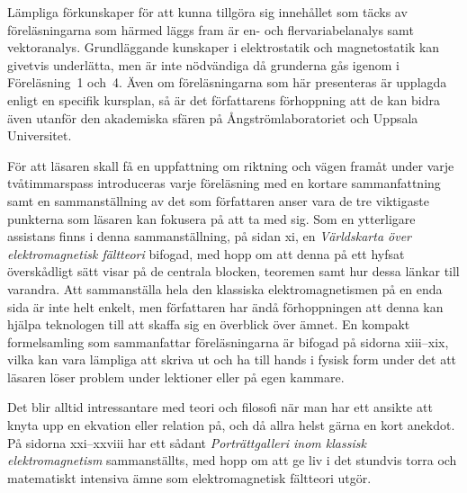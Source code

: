 {  L{\"a}mpliga f{\"o}rkunskaper f{\"o}r att kunna tillg{\"o}ra sig
  inneh{\aa}llet som t{\"a}cks av f{\"o}rel{\"a}sningarna som h{\"a}rmed
  l{\"a}ggs fram {\"a}r en- och flervariabelanalys samt vektoranalys.
  Grundl{\"a}ggande kunskaper i elektrostatik och magnetostatik kan givetvis
  underl{\"a}tta, men {\"a}r inte n{\"o}dv{\"a}ndiga d{\aa} grunderna g{\aa}s
  igenom i F{\"o}rel{\"a}sning~1 och~4.
  {\"A}ven om f{\"o}rel{\"a}sningarna som h{\"a}r presenteras {\"a}r upplagda
  enligt en specifik kursplan, s{\aa} {\"a}r det f{\"o}rfattarens
  f{\"o}rhoppning att de kan bidra {\"a}ven utanf{\"o}r den akademiska
  sf{\"a}ren p{\aa} {\AA}ngstr{\"o}mlaboratoriet och Uppsala Universitet.

  \bigskip{}\medskip\noindent
  F{\"o}r att l{\"a}saren skall f{\aa} en uppfattning om riktning och
  v{\"a}gen fram{\aa}t under varje tv{\aa}timmarspass introduceras varje
  f{\"o}rel{\"a}sning med en kortare sammanfattning samt en sammanst{\"a}llning
  av det som f{\"o}rfattaren anser vara de tre viktigaste punkterna som
  l{\"a}saren kan fokusera p{\aa} att ta med sig.
  Som en ytterligare assistans finns i denna sammanst{\"a}llning, p{\aa} sidan
  xi, en {\it V{\"a}rldskarta {\"o}ver elektromagnetisk f{\"a}ltteori}
  bifogad,
  med hopp om att denna p{\aa} ett hyfsat {\"o}versk{\aa}dligt s{\"a}tt visar
  p{\aa} de centrala blocken, teoremen samt hur dessa l{\"a}nkar till varandra.
  Att sammanst{\"a}lla hela den klassiska elektromagnetismen p{\aa} en enda
  sida {\"a}r inte helt enkelt, men f{\"o}rfattaren har {\"a}nd{\aa}
  f{\"o}rhoppningen att denna kan hj{\"a}lpa teknologen till att skaffa
  sig en {\"o}verblick {\"o}ver {\"a}mnet.
  En kompakt formelsamling som sammanfattar f{\"o}rel{\"a}sningarna {\"a}r
  bifogad p{\aa} sidorna xiii--xix, vilka kan vara l{\"a}mpliga att skriva ut
  och ha till hands i fysisk form under det att l{\"a}saren l{\"o}ser problem
  under lektioner eller p{\aa} egen kammare.

  \bigskip{}\medskip\noindent
  Det blir alltid intressantare med teori och filosofi n{\"a}r man har ett
  ansikte att knyta upp en ekvation eller relation p{\aa}, och d{\aa} allra
  helst g{\"a}rna en kort anekdot. P{\aa} sidorna xxi--xxviii har ett s{\aa}dant
  {\it Portr{\"a}ttgalleri inom klassisk elektromagnetism} sammanst{\"a}llts,
  med hopp om att ge liv i det stundvis torra och matematiskt intensiva
  {\"a}mne som elektromagnetisk f{\"a}ltteori utg{\"o}r.

}
